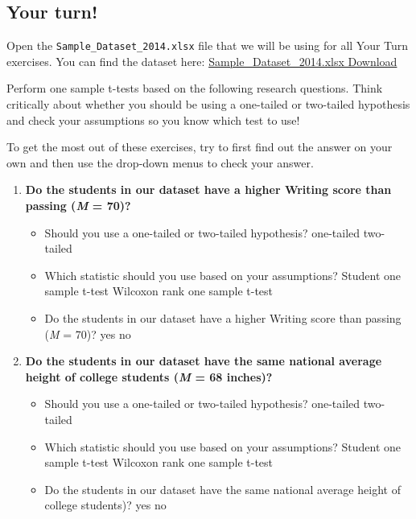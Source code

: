 \documentclass[
]{book}
\begin{document}
\hypertarget{your-turn}{%
\subsection{Your turn!}\label{your-turn}}

Open the \texttt{Sample\_Dataset\_2014.xlsx} file that we will be using for all Your Turn exercises. You can find the dataset here: \href{https://github.com/danawanzer/stats-with-jamovi/blob/master/data/Sample_Dataset_2014.xlsx}{Sample\_Dataset\_2014.xlsx Download}

Perform one sample t-tests based on the following research questions. Think critically about whether you should be using a one-tailed or two-tailed hypothesis and check your assumptions so you know which test to use!

To get the most out of these exercises, try to first find out the answer on your own and then use the drop-down menus to check your answer.

\begin{enumerate}
\def\labelenumi{\arabic{enumi}.}
\item
  \textbf{Do the students in our dataset have a higher Writing score than passing (\emph{M} = 70)?}

  \begin{itemize}
  \item
    Should you use a one-tailed or two-tailed hypothesis? one-tailed two-tailed
  \item
    Which statistic should you use based on your assumptions? Student one sample t-test Wilcoxon rank one sample t-test
  \item
    Do the students in our dataset have a higher Writing score than passing (\emph{M} = 70)? yes no
  \end{itemize}
\item
  \textbf{Do the students in our dataset have the same national average height of college students (\emph{M} = 68 inches)?}

  \begin{itemize}
  \item
    Should you use a one-tailed or two-tailed hypothesis? one-tailed two-tailed
  \item
    Which statistic should you use based on your assumptions? Student one sample t-test Wilcoxon rank one sample t-test
  \item
    Do the students in our dataset have the same national average height of college students)? yes no
  \end{itemize}
\end{enumerate}
\end{document}

